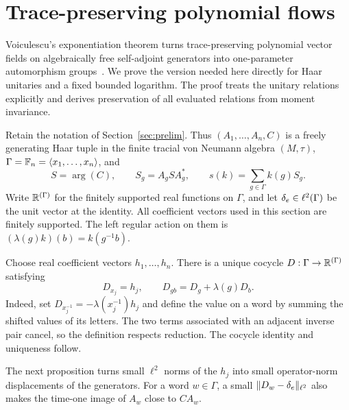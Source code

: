 \section{Trace-preserving polynomial flows}
\label{sec:flow}

Voiculescu's exponentiation theorem turns trace-preserving polynomial
vector fields on algebraically free self-adjoint generators into
one-parameter automorphism groups~\cite[Theorem~3.8]{voiculescu2002cyclomorphy}.
We prove the version needed here directly for Haar unitaries and a fixed
bounded logarithm. The proof treats the unitary relations explicitly
and derives preservation of all evaluated relations from moment invariance.

Retain the notation of Section~\ref{sec:prelim}. Thus
$(A_1,\ldots,A_n,C)$ is a freely generating Haar tuple in the finite
tracial von Neumann algebra $(M,\tau)$,
$\Gamma=\mathbb F_n=\langle x_1,\ldots,x_n\rangle$, and
\[
 S=\arg(C),\qquad S_g=A_gSA_g^*,\qquad
 s(k)=\sum_{g\in\Gamma}k(g)S_g.
\]
Write $\mathbb R^{(\Gamma)}$ for the finitely supported real functions on
$\Gamma$, and let $\delta_e\in\ell^2(\Gamma)$ be the unit vector at the
identity. All coefficient vectors used in this section are finitely supported.
The left regular action on them is
$(\lambda(g)k)(b)=k(g^{-1}b)$.

Choose real coefficient vectors $h_1,\ldots,h_n$. There is a unique
cocycle $D:\Gamma\to\mathbb R^{(\Gamma)}$ satisfying
\begin{equation}
 D_{x_j}=h_j,\qquad D_{gb}=D_g+\lambda(g)D_b.
 \label{eq:flow-cocycle}
\end{equation}
Indeed, set $D_{x_j^{-1}}=-\lambda(x_j^{-1})h_j$ and define the value
on a word by summing the shifted values of its letters. The two terms
associated with an adjacent inverse pair cancel, so the definition
respects reduction. The cocycle identity and uniqueness follow.

The next proposition turns small $\ell^2$ norms of the $h_j$ into
small operator-norm displacements of the generators. For a word
$w\in\Gamma$, a small $\|D_w-\delta_e\|_{\ell^2}$ also makes the
time-one image of $A_w$ close to $CA_w$.

